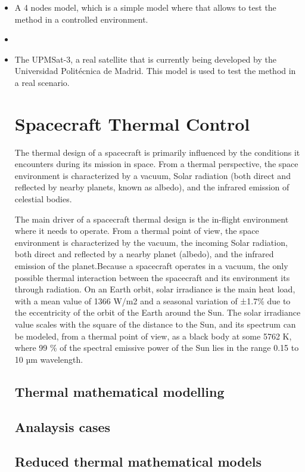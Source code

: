 \begin{itemize}
	\item A 4 nodes model, which is a simple model where  that allows to test the method in a controlled environment.
	\item 
	\item The UPMSat-3, a real satellite that is currently being developed by the Universidad Politécnica de Madrid. This model is used to test the method in a real scenario.




\section{Spacecraft Thermal Control}

The thermal design of a spacecraft is primarily influenced by the conditions it encounters during its mission in space. From a thermal perspective, the space environment is characterized by a vacuum, Solar radiation (both direct and reflected by nearby planets, known as albedo), and the infrared emission of celestial bodies.

The main driver of a spacecraft thermal design is the in-flight environment where it needs to operate. From a thermal point of view, the space environment is characterized by the vacuum, the incoming Solar radiation, both direct and reflected by a nearby planet (albedo), and the infrared
emission of the planet.Because a spacecraft operates in a vacuum, the only possible thermal interaction between the spacecraft and its environment its through radiation. On an Earth orbit, solar irradiance is the main heat load, with a mean value of 1366 W/m2 and a seasonal variation of ±1.7\% due to the eccentricity of the orbit of the Earth around the Sun. The solar irradiance value scales with the square of the distance to the Sun, and its spectrum can be modeled, from a thermal point of view, as a black body at some 5762 K, where 99 \% of the spectral emissive power of the Sun lies in the range 0.15 to 10 µm wavelength.

\subsection{Thermal mathematical modelling}
\subsection{Analaysis cases}
\subsection{Reduced thermal mathematical models}


\end{itemize}
